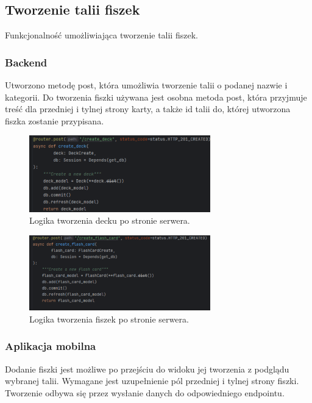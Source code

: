 \subsection{Tworzenie talii fiszek}

Funkcjonalność umożliwiająca tworzenie talii fiszek.

\subsubsection{Backend}

Utworzono metodę post, która umożliwia tworzenie talii o podanej nazwie i kategorii. Do tworzenia fiszki używana jest osobna metoda post, która przyjmuje treść dla przedniej i tylnej strony karty, a także id talii do, której utworzona fiszka zostanie przypisana.

\begin{figure}[H]
    \centering
    \includegraphics[width=0.7\textwidth]{chapters/chapter_8/screens/create_deck_backend}
    \caption{Logika tworzenia decku po stronie serwera.}
    \label{img:create_deck_backend}
\end{figure}

\begin{figure}[H]
    \centering
    \includegraphics[width=0.7\textwidth]{chapters/chapter_8/screens/create_flash_card_backend}
    \caption{Logika tworzenia fiszek po stronie serwera.}
    \label{img:create_flash_card_backend}
\end{figure}

\subsubsection{Aplikacja mobilna}
Dodanie fiszki jest możliwe po przejściu do widoku jej tworzenia z podglądu wybranej talii. Wymagane jest uzupełnienie pól przedniej i tylnej strony fiszki. Tworzenie odbywa się przez wysłanie danych do odpowiedniego endpointu.

